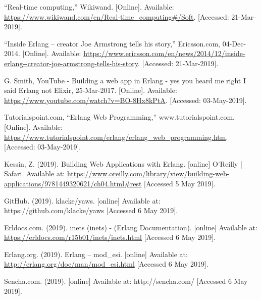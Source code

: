 \documentclass[11 pt]{IEEEtran}
\begin{document}
\begin{thebibliography}{99}
“Real-time computing,” Wikiwand. [Online]. Available: \url{https://www.wikiwand.com/en/Real-time_computing#/Soft}. [Accessed: 21-Mar-2019].

“Inside Erlang – creator Joe Armstrong tells his story,” Ericsson.com, 04-Dec-2014. [Online]. Available: \url{https://www.ericsson.com/en/news/2014/12/inside-erlang--creator-joe-armstrong-tells-his-story}. [Accessed: 21-Mar-2019].

G. Smith, YouTube - Building a web app in Erlang - yes you heard me right I said Erlang not Elixir, 25-Mar-2017. [Online]. Available: \url{https://www.youtube.com/watch?v=BO-8Hx8kPtA}. [Accessed: 03-May-2019].

Tutorialspoint.com, ``Erlang Web Programming,'' www.tutorialspoint.com. [Online]. Available: \url{https://www.tutorialspoint.com/erlang/erlang_web_programming.htm}. [Accessed: 03-May-2019].

Kessin, Z. (2019). Building Web Applications with Erlang. [online] O'Reilly | Safari. Available at: \url{https://www.oreilly.com/library/view/building-web-applications/9781449320621/ch04.html#rest} [Accessed 5 May 2019].

GitHub. (2019). klacke/yaws. [online] Available at: https://github.com/klacke/yaws [Accessed 6 May 2019].

Erldocs.com. (2019). inets (inets) - (Erlang Documentation). [online] Available at: \url{https://erldocs.com/r15b01/inets/inets.html} [Accessed 6 May 2019].

Erlang.org. (2019). Erlang -- mod\_esi. [online] Available at: \url{http://erlang.org/doc/man/mod_esi.html} [Accessed 6 May 2019].

Sencha.com. (2019). [online] Available at: http://sencha.com/ [Accessed 6 May 2019].

\end{thebibliography}
\end{document}
